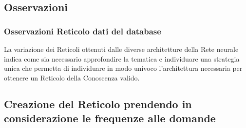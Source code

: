 \subsection{Osservazioni}
\subsubsection{Osservazioni Reticolo dati del database}
La variazione dei Reticoli ottenuti dalle diverse architetture della Rete neurale indica come sia necessario approfondire la tematica e individuare una strategia unica che permetta di individuare in modo univoco l'architettura necessaria per ottenere un Reticolo della Conoscenza valido.

\subsection{Creazione del Reticolo prendendo in considerazione le frequenze alle domande}
\label{Creazione del Reticolo prendendo in considerazione le frequenze alle domande}









